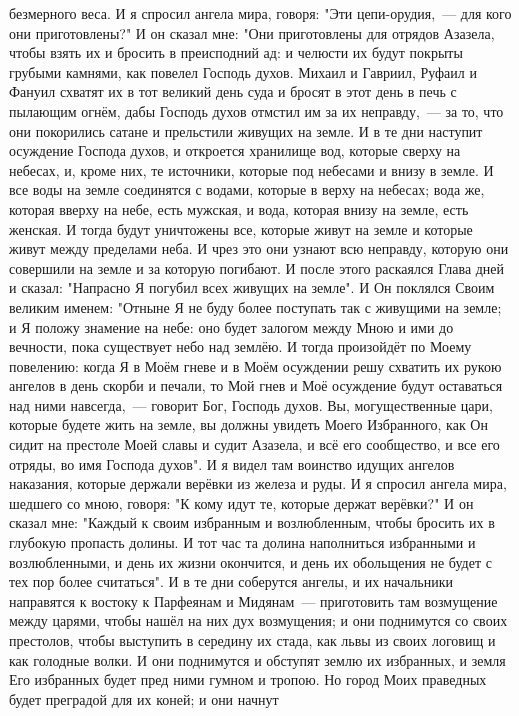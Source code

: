 безмерного веса.
И я спросил ангела мира, говоря: "Эти цепи-орудия,~--- для кого они
приготовлены?"
И он сказал мне: "Они приготовлены для отрядов Азазела, чтобы взять их
и бросить в преисподний ад: и челюсти их будут покрыты грубыми камнями, как
повелел Господь духов.
Михаил и Гавриил, Руфаил и Фануил схватят их в тот великий день суда и
бросят в этот день в печь с пылающим огнём, дабы Господь духов отмстил им за их
неправду,~--- за то, что они покорились сатане и прельстили живущих на земле.
И в те дни наступит осуждение Господа духов, и откроется хранилище
вод, которые сверху на небесах, и, кроме них, те источники, которые под
небесами и внизу в земле.
И все воды на земле соединятся с водами, которые в верху на небесах;
вода же, которая вверху на небе, есть мужская, и вода, которая внизу на земле,
есть женская.
И тогда будут уничтожены все, которые живут на земле и которые живут
между пределами неба.
И чрез это они узнают всю неправду, которую они совершили на земле и
за которую погибают.
И после этого раскаялся Глава дней и сказал: "Напрасно Я погубил
всех живущих на земле".
И Он поклялся Своим великим именем: "Отныне Я не буду более поступать
так с живущими на земле; и Я положу знамение на небе: оно будет залогом между
Мною и ими до вечности, пока существует небо над землёю.
И тогда произойдёт по Моему повелению: когда Я в Моём гневе и в Моём
осуждении решу схватить их рукою ангелов в день скорби и печали, то Мой гнев и
Моё осуждение будут оставаться над ними навсегда,~--- говорит Бог, Господь духов.
Вы, могущественные цари, которые будете жить на земле, вы должны
увидеть Моего Избранного, как Он сидит на престоле Моей славы и судит Азазела,
и всё его сообщество, и все его отряды, во имя Господа духов".
И я видел там воинство идущих ангелов наказания, которые держали
верёвки из железа и руды.
И я спросил ангела мира, шедшего со мною, говоря: "К кому идут те,
которые держат верёвки?"
И он сказал мне: "Каждый к своим избранным и возлюбленным, чтобы
бросить их в глубокую пропасть долины.
И тот час та долина наполниться избранными и возлюбленными, и день их
жизни окончится, и день их обольщения не будет с тех пор более считаться".
И в те дни соберутся ангелы, и их начальники направятся к востоку к
Парфеянам и Мидянам~--- приготовить там возмущение между царями, чтобы нашёл на
них дух возмущения; и они поднимутся со своих престолов, чтобы выступить в
середину их стада, как львы из своих логовищ и как голодные волки.
И они поднимутся и обступят землю их избранных, и земля Его избранных
будет пред ними гумном и тропою.
Но город Моих праведных будет преградой для их коней; и они начнут
